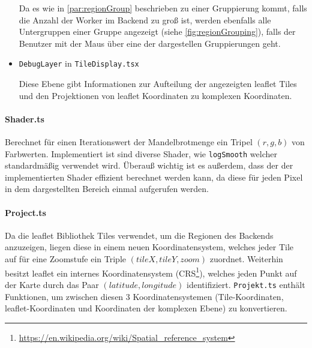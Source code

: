 \begin{itemize}
	      Da es wie in \autoref{par:regionGroup} beschrieben zu einer Gruppierung kommt, falls die Anzahl der Worker im Backend zu
	      groß ist, werden ebenfalls alle Untergruppen einer Gruppe angezeigt (siehe \autoref{fig:regionGrouping}), falls der Benutzer mit der Maus über eine der
	      dargestellen Gruppierungen geht.
	\item \verb|DebugLayer| in \verb|TileDisplay.tsx|

	      Diese Ebene gibt Informationen zur Aufteilung der angezeigten leaflet Tiles und den Projektionen von
	      leaflet Koordinaten zu komplexen Koordinaten.
\end{itemize}

\paragraph{Shader.ts}\label{par:shader}
Berechnet für einen Iterationswert der Mandelbrotmenge ein Tripel \( (r,g,b) \) von Farbwerten.
Implementiert ist sind diverse Shader, wie \verb|logSmooth| welcher standardmäßig verwendet wird.
Überauß wichtig ist es außerdem, dass der der implementierten Shader effizient berechnet werden kann, da diese
für jeden Pixel in dem dargestellten Bereich einmal aufgerufen werden.

\paragraph{Project.ts}
Da die leaflet Bibliothek Tiles verwendet, um die Regionen des Backends anzuzeigen, liegen diese in
einem neuen Koordinatensystem, welches jeder Tile auf für eine Zoomstufe ein Triple \( (tileX, tileY, zoom) \) zuordnet.
Weiterhin besitzt leaflet ein internes Koordinatensystem (CRS\footnote{\url{https://en.wikipedia.org/wiki/Spatial_reference_system}}),
welches jeden Punkt auf der Karte durch das Paar \( (latitude, longitude) \) identifiziert.
\verb|Projekt.ts| enthält Funktionen, um zwischen diesen 3 Koordinatensystemen
(Tile-Koordinaten, leaflet-Koordinaten und Koordinaten der komplexen Ebene) zu konvertieren.

